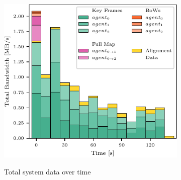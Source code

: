 \begin{figure}[h]
    \centering
    \begin{subfigure}[b]{0.55\linewidth}
        \centering
         {
            \includegraphics[width=\linewidth, valign=t]{figures/apr11_tum_room_trajectory_a_bandwith.pdf}
        }
        \caption{Total system data over time}
    \end{subfigure}%
    ~
    \begin{subfigure}[b]{0.45\linewidth}
        \flushright
\end{subfigure}
\end{figure}
